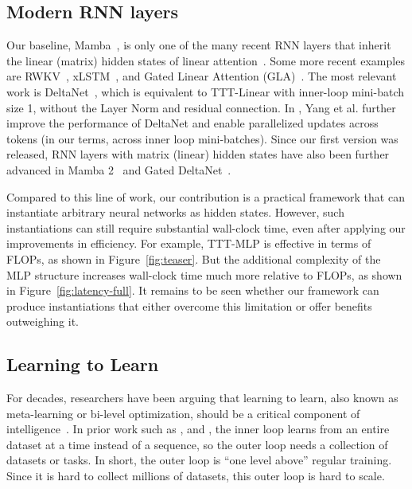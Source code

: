 \documentclass{article}
\begin{document}
\subsection{Modern RNN layers}

Our baseline, Mamba~\cite{gu2023mamba}, is only one of the many recent RNN layers that inherit the  linear (matrix) hidden states of linear attention~\cite{katharopoulos2020transformers, schlag2020learning}.
Some more recent examples are RWKV~\cite{peng2023rwkv, peng2024eagle}, xLSTM~\cite{beck2024xlstm}, and Gated Linear Attention (GLA)~\cite{yang2023gated}.
The most relevant work is DeltaNet~\cite{schlag2021linear}, which is equivalent to TTT-Linear with inner-loop mini-batch size 1, without the Layer Norm and residual connection.
In \cite{yang2024parallelizing}, Yang et al. further improve the performance of DeltaNet and enable parallelized updates across tokens (in our terms, across inner loop mini-batches).
Since our first version was released, RNN layers with matrix (linear) hidden states have also been further advanced in Mamba 2~\cite{dao2024transformers} and Gated DeltaNet~\cite{yang2023gated}.

Compared to this line of work, our contribution is a practical framework that can instantiate arbitrary neural networks as hidden states.
However, such instantiations can still require substantial wall-clock time, even after applying our improvements in efficiency.
For example, TTT-MLP is effective in terms of FLOPs, as shown in Figure~\ref{fig:teaser}. 
But the additional complexity of the MLP structure increases wall-clock time much more relative to FLOPs, as shown in Figure~\ref{fig:latency-full}.
It remains to be seen whether our framework can produce instantiations that either overcome this limitation or offer benefits outweighing it.

\subsection{Learning to Learn}

For decades, researchers have been arguing that learning to learn, also known as meta-learning or bi-level optimization, should be a critical component of intelligence~\cite{schmidhuber1987evolutionary, bengio1990learning, thrun1998learning, lake2017building}.
In prior work such as \cite{andrychowicz2016learning}, \cite{finn2017model} and \cite{metz2018meta}, the inner loop learns from an entire dataset at a time instead of a sequence, so the outer loop needs a collection of datasets or tasks.
In short, the outer loop  is ``one level above'' regular training.
Since it is hard to collect millions of datasets, this outer loop is hard to scale.
\end{document}
